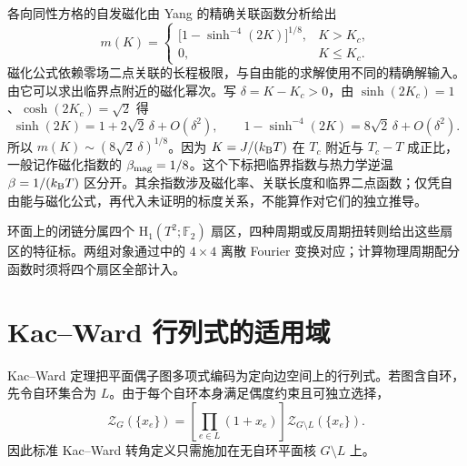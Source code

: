 各向同性方格的自发磁化由 Yang 的精确关联函数分析给出
\begin{equation}
m(K)=
\begin{cases}
\bigl[1-\sinh^{-4}(2K)\bigr]^{1/8},&K>K_c,\\
0,&K\le K_c.
\end{cases}
\label{eq:phys-sm-onsager-magnetization}
\end{equation}
磁化公式依赖零场二点关联的长程极限，与自由能的求解使用不同的精确解输入。由它可以求出临界点附近的磁化幂次。写 \(\delta=K-K_c>0\)，由 \(\sinh(2K_c)=1\)、\(\cosh(2K_c)=\sqrt2\) 得
\[
\sinh(2K)=1+2\sqrt2\,\delta+O(\delta^2),\qquad
1-\sinh^{-4}(2K)=8\sqrt2\,\delta+O(\delta^2).
\]
所以 \(m(K)\sim(8\sqrt2\,\delta)^{1/8}\)。因为 \(K=J/(k_{\rm B}T)\) 在 \(T_c\) 附近与 \(T_c-T\) 成正比，一般记作磁化指数的 \(\beta_{\rm mag}=1/8\)。这个下标把临界指数与热力学逆温 \(\beta=1/(k_{\rm B}T)\) 区分开。其余指数涉及磁化率、关联长度和临界二点函数；仅凭自由能与磁化公式，再代入未证明的标度关系，不能算作对它们的独立推导。

环面上的闭链分属四个 \(\mathrm H_1(T^2;\mathbb F_2)\) 扇区，四种周期或反周期扭转则给出这些扇区的特征标。两组对象通过中的 \(4\times4\) 离散 Fourier 变换对应；计算物理周期配分函数时须将四个扇区全部计入。

\section{Kac--Ward 行列式的适用域}
\label{sec:phys-sm-kac-ward}

Kac--Ward 定理把平面偶子图多项式编码为定向边空间上的行列式。若图含自环，先令自环集合为 \(L\)。由于每个自环本身满足偶度约束且可独立选择，
\begin{equation}
 \mathcal Z_G(\{x_e\})
 =\left[\prod_{e\in L}(1+x_e)\right]
 \mathcal Z_{G\setminus L}(\{x_e\}).
 \label{eq:phys-sm-loop-factorization}
\end{equation}
因此标准 Kac--Ward 转角定义只需施加在无自环平面核 \(G\setminus L\) 上。

